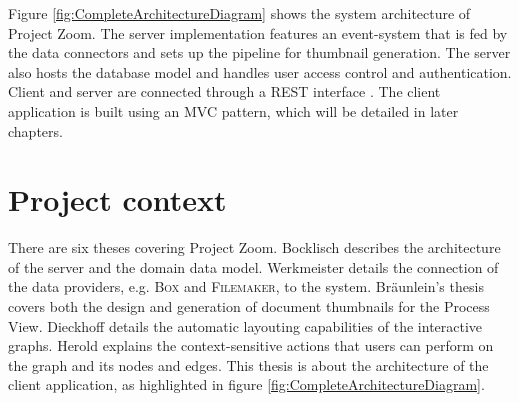 Figure \ref{fig:CompleteArchitectureDiagram} shows the system architecture of Project Zoom. The server implementation features an event-system that is fed by the data connectors and sets up the pipeline for thumbnail generation. The server also hosts the database model and handles user access control and authentication. Client and server are connected through a REST interface \cite{Fielding_2000}. The client application is built using an MVC pattern, which will be detailed in later chapters. 

\section{Project context}
There are six theses covering Project Zoom. Bocklisch \cite{Bocklisch_2013} describes the architecture of the server and the domain data model. Werkmeister \cite{Werkmeister_2013} details the connection of the data pro\-vi\-ders, e.g. \textsc{Box} and \textsc{Filemaker}, to the system. Bräunlein's thesis \cite{Braeunlein_2013} covers both the design and generation of document thumbnails for the Process View. Dieckhoff \cite{Dieckhoff_2013} details the automatic layouting capabilities of the interactive graphs. Herold \cite{Herold_2013} explains the context-sensitive actions that users can perform on the graph and its nodes and edges. This thesis is about the architecture of the client application, as highlighted in figure \ref{fig:CompleteArchitectureDiagram}.

